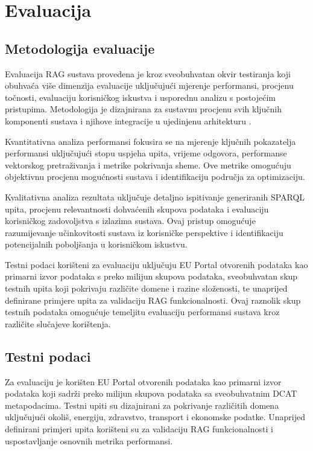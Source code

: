 \chapter{Evaluacija}
\label{ch:evaluation}


\section{Metodologija evaluacije}
\label{sec:methodology}

Evaluacija RAG sustava provedena je kroz sveobuhvatan okvir testiranja koji obuhvaća više dimenzija evaluacije uključujući mjerenje performansi, procjenu točnosti, evaluaciju korisničkog iskustva i usporednu analizu s postojećim pristupima. Metodologija je dizajnirana za sustavnu procjenu svih ključnih komponenti sustava i njihove integracije u ujedinjenu arhitekturu \cite{charalabidis2018open, neumaier2016automated}.

Kvantitativna analiza performansi fokusira se na mjerenje ključnih pokazatelja performansi uključujući stopu uspjeha upita, vrijeme odgovora, performanse vektorskog pretraživanja i metrike pokrivanja sheme. Ove metrike omogućuju objektivnu procjenu mogućnosti sustava i identifikaciju područja za optimizaciju.

Kvalitativna analiza rezultata uključuje detaljno ispitivanje generiranih SPARQL upita, procjenu relevantnosti dohvaćenih skupova podataka i evaluaciju korisničkog zadovoljstva s izlazima sustava. Ovaj pristup omogućuje razumijevanje učinkovitosti sustava iz korisničke perspektive i identifikaciju potencijalnih poboljšanja u korisničkom iskustvu.

Testni podaci korišteni za evaluaciju uključuju EU Portal otvorenih podataka kao primarni izvor podataka s preko milijun skupova podataka, sveobuhvatan skup testnih upita koji pokrivaju različite domene i razine složenosti, te unaprijed definirane primjere upita za validaciju RAG funkcionalnosti. Ovaj raznolik skup testnih podataka omogućuje temeljitu evaluaciju performansi sustava kroz različite slučajeve korištenja.

\section{Testni podaci}
\label{sec:test_data}

Za evaluaciju je korišten EU Portal otvorenih podataka kao primarni izvor podataka koji sadrži preko milijun skupova podataka sa sveobuhvatnim DCAT metapodacima. Testni upiti su dizajnirani za pokrivanje različitih domena uključujući okoliš, energiju, zdravstvo, transport i ekonomske podatke. Unaprijed definirani primjeri upita korišteni su za validaciju RAG funkcionalnosti i uspostavljanje osnovnih metrika performansi.

